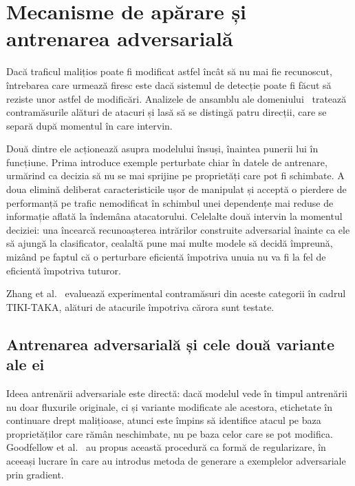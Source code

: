 \section{Mecanisme de apărare și antrenarea adversarială}\label{sec:aparare}

Dacă traficul malițios poate fi modificat astfel încât să nu mai fie recunoscut, întrebarea care urmează firesc este dacă sistemul de detecție poate fi făcut să reziste unor astfel de modificări. Analizele de ansamblu ale domeniului~\cite{he2023adversarial, alotaibi2023adversarial} tratează contramăsurile alături de atacuri și lasă să se distingă patru direcții, care se separă după momentul în care intervin.

Două dintre ele acționează asupra modelului însuși, înaintea punerii lui în funcțiune. Prima introduce exemple perturbate chiar în datele de antrenare, urmărind ca decizia să nu se mai sprijine pe proprietăți care pot fi schimbate. A doua elimină deliberat caracteristicile ușor de manipulat și acceptă o pierdere de performanță pe trafic nemodificat în schimbul unei dependențe mai reduse de informație aflată la îndemâna atacatorului. Celelalte două intervin la momentul deciziei: una încearcă recunoașterea intrărilor construite adversarial înainte ca ele să ajungă la clasificator, cealaltă pune mai multe modele să decidă împreună, mizând pe faptul că o perturbare eficientă împotriva unuia nu va fi la fel de eficientă împotriva tuturor.

Zhang et al.~\cite{zhang2022adversarial} evaluează experimental contramăsuri din aceste categorii în cadrul TIKI-TAKA, alături de atacurile împotriva cărora sunt testate.

\subsection{Antrenarea adversarială și cele două variante ale ei}\label{subsec:antrenare-adv}

Ideea antrenării adversariale este directă: dacă modelul vede în timpul antrenării nu doar fluxurile originale, ci și variante modificate ale acestora, etichetate în continuare drept malițioase, atunci este împins să identifice atacul pe baza proprietăților care rămân neschimbate, nu pe baza celor care se pot modifica. Goodfellow et al.~\cite{goodfellow2015explaining} au propus această procedură ca formă de regularizare, în aceeași lucrare în care au introdus metoda de generare a exemplelor adversariale prin gradient.

